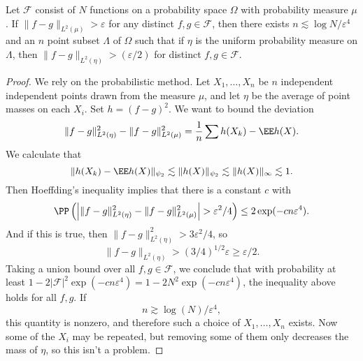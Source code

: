 \begin{lemma}
	Let $\mathcal{F}$ consist of $N$ functions on a probability space $\Omega$ with probability measure $\mu$. If $\| f - g \|_{L^2(\mu)} > \varepsilon$ for any distinct $f,g \in \mathcal{F}$, then there exists $n \lesssim \log N / \varepsilon^4$ and an $n$ point subset $\Lambda$ of $\Omega$ such that if $\eta$ is the uniform probability measure on $\Lambda$, then $\| f - g \|_{L^2(\eta)} > (\varepsilon/2)$ for distinct $f,g \in \mathcal{F}$.
\end{lemma}
\begin{proof}
	We rely on the probabilistic method. Let $X_1, \dots, X_n$ be $n$ independent independent points drawn from the measure $\mu$, and let $\eta$ be the average of point masses on each $X_i$. Set $h = (f - g)^2$. We want to bound the deviation
	\[ \| f - g \|^2_{L^2(\eta)} - \| f - g \|_{L^2(\mu)}^2 = \frac{1}{n} \sum h(X_k) - \EE h(X). \]
	We calculate that
	\[ \| h(X_k) - \EE h(X) \|_{\psi_2} \lesssim \| h(X) \|_{\psi_2} \lesssim \| h(X) \|_\infty \lesssim 1. \]
	Then Hoeffding's inequality implies that there is a constant $c$ with
	\[ \PP \left( \left| \| f - g \|_{L^2(\eta)}^2 - \| f - g \|_{L^2(\mu)}^2 \right| > \varepsilon^2/4 \right) \leq 2 \exp(- c n \varepsilon^4). \]
	And if this is true, then $\| f - g \|_{L^2(\eta)}^2 > 3\varepsilon^2/4$, so
	\[ \| f - g \|_{L^2(\eta)} > (3/4)^{1/2} \varepsilon \geq \varepsilon/2. \]
	Taking a union bound over all $f,g \in \mathcal{F}$, we conclude that with probability at least $1 - 2 |\mathcal{F}|^2 \exp(-cn \varepsilon^4) = 1 - 2N^2 \exp(-cn \varepsilon^4)$, the inequality above holds for all $f,g$. If
	\[ n \gtrsim \log(N) / \varepsilon^4, \]
	this quantity is nonzero, and therefore such a choice of $X_1, \dots, X_n$ exists. Now some of the $X_i$ may be repeated, but removing some of them only decreases the mass of $\eta$, so this isn't a problem.
\end{proof}

